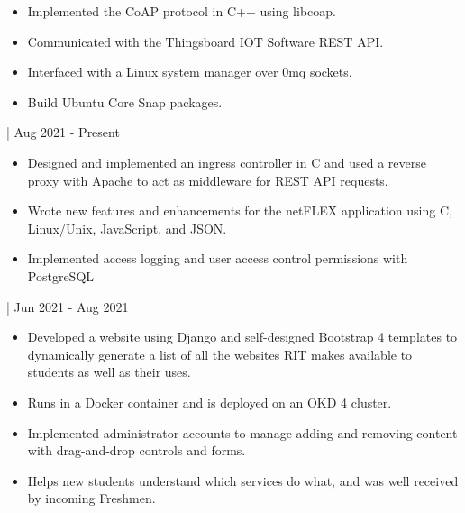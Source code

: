 \documentclass[11pt,letterpaper,ragged2e]{altacv}
\begin{document}

\begin{fullwidth}
\makecvheader
\end{fullwidth}




{
\begin{itemize}
    \item Implemented the CoAP protocol in C++ using libcoap.
    \item Communicated with the Thingsboard IOT Software REST API.
    \item Interfaced with a Linux system manager over 0mq sockets.
    \item Build Ubuntu Core Snap packages.
\end{itemize}
}
{| Aug 2021 - Present} \

{
\begin{itemize}
    \item Designed and implemented an ingress controller in C and used a reverse proxy with Apache to act as middleware for REST API requests. 
    \item Wrote new features and enhancements for the netFLEX application using C, Linux/Unix, JavaScript, and JSON.
    \item Implemented access logging and user access control permissions with PostgreSQL
\end{itemize}
}
{| Jun 2021 - Aug 2021} \


{
\begin{itemize}
    \item Developed a website using Django and self-designed Bootstrap 4 templates to dynamically generate a list of all the websites RIT makes available to students as well as their uses.
    \item Runs in a Docker container and is deployed on an OKD 4 cluster.
    \item Implemented administrator accounts to manage adding and removing content with drag-and-drop controls and forms.
    \item Helps new students understand which services do what, and was well received by incoming Freshmen.
\end{itemize}
}
{}
\end{document}

